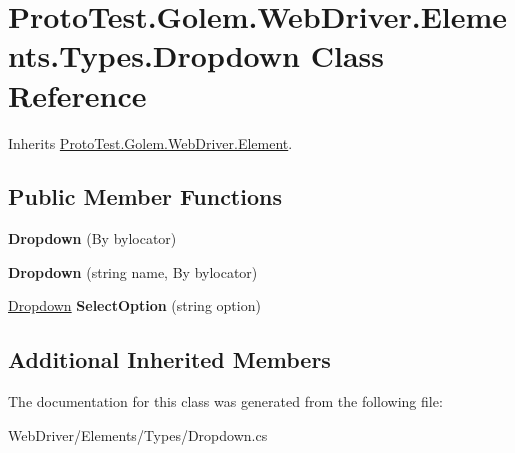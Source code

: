 \hypertarget{class_proto_test_1_1_golem_1_1_web_driver_1_1_elements_1_1_types_1_1_dropdown}{\section{Proto\-Test.\-Golem.\-Web\-Driver.\-Elements.\-Types.\-Dropdown Class Reference}
\label{class_proto_test_1_1_golem_1_1_web_driver_1_1_elements_1_1_types_1_1_dropdown}
}


Inherits \hyperlink{class_proto_test_1_1_golem_1_1_web_driver_1_1_element}{Proto\-Test.\-Golem.\-Web\-Driver.\-Element}.

\subsection*{Public Member Functions}
\begin{DoxyCompactItemize}
\item 
\hypertarget{class_proto_test_1_1_golem_1_1_web_driver_1_1_elements_1_1_types_1_1_dropdown_acec70dad9e464e1924768ba323247571}{{\bfseries Dropdown} (By bylocator)}\label{class_proto_test_1_1_golem_1_1_web_driver_1_1_elements_1_1_types_1_1_dropdown_acec70dad9e464e1924768ba323247571}

\item 
\hypertarget{class_proto_test_1_1_golem_1_1_web_driver_1_1_elements_1_1_types_1_1_dropdown_a2f89e396a272533f76cc4160ca33098f}{{\bfseries Dropdown} (string name, By bylocator)}\label{class_proto_test_1_1_golem_1_1_web_driver_1_1_elements_1_1_types_1_1_dropdown_a2f89e396a272533f76cc4160ca33098f}

\item 
\hypertarget{class_proto_test_1_1_golem_1_1_web_driver_1_1_elements_1_1_types_1_1_dropdown_a479e62a83320134176888538d6a1690d}{\hyperlink{class_proto_test_1_1_golem_1_1_web_driver_1_1_elements_1_1_types_1_1_dropdown}{Dropdown} {\bfseries Select\-Option} (string option)}\label{class_proto_test_1_1_golem_1_1_web_driver_1_1_elements_1_1_types_1_1_dropdown_a479e62a83320134176888538d6a1690d}

\end{DoxyCompactItemize}
\subsection*{Additional Inherited Members}


The documentation for this class was generated from the following file\-:\begin{DoxyCompactItemize}
\item 
Web\-Driver/\-Elements/\-Types/Dropdown.\-cs\end{DoxyCompactItemize}
